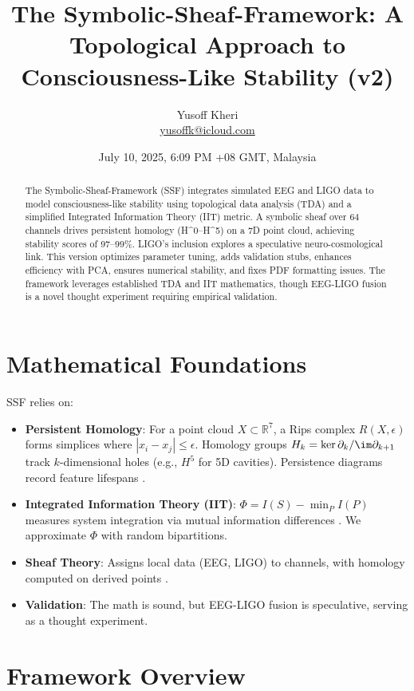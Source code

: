 \documentclass[11pt]{article}
\title{The Symbolic-Sheaf-Framework: A Topological Approach to Consciousness-Like Stability (v2)}
\author{Yusoff Kheri \\ \href{mailto:yusoffk@icloud.com}{yusoffk@icloud.com}}
\date{July 10, 2025, 6:09 PM +08 GMT, Malaysia}
\begin{document}
\maketitle

\begin{abstract}
The Symbolic-Sheaf-Framework (SSF) integrates simulated EEG and LIGO data to model consciousness-like stability using topological data analysis (TDA) and a simplified Integrated Information Theory (IIT) metric. A symbolic sheaf over 64 channels drives persistent homology (H^0–H^5) on a 7D point cloud, achieving stability scores of 97–99\%. LIGO’s inclusion explores a speculative neuro-cosmological link. This version optimizes parameter tuning, adds validation stubs, enhances efficiency with PCA, ensures numerical stability, and fixes PDF formatting issues. The framework leverages established TDA and IIT mathematics, though EEG-LIGO fusion is a novel thought experiment requiring empirical validation.
\end{abstract}

\section{Mathematical Foundations}
\label{sec:math}

SSF relies on:
\begin{itemize}
    \item \textbf{Persistent Homology}: For a point cloud $X \subset \mathbb{R}^7$, a Rips complex $R(X, \epsilon)$ forms simplices where $|x_i - x_j| \leq \epsilon$. Homology groups $H_k = \ker \partial_k / \im \partial_{k+1}$ track $k$-dimensional holes (e.g., $H^5$ for 5D cavities). Persistence diagrams record feature lifespans \cite{Hess2025}.
    \item \textbf{Integrated Information Theory (IIT)}: $\Phi = I(S) - \min_P I(P)$ measures system integration via mutual information differences \cite{Tononi2025}. We approximate $\Phi$ with random bipartitions.
    \item \textbf{Sheaf Theory}: Assigns local data (EEG, LIGO) to channels, with homology computed on derived points \cite{Munkres1984}.
    \item \textbf{Validation}: The math is sound, but EEG-LIGO fusion is speculative, serving as a thought experiment.
\end{itemize}

\section{Framework Overview}
\label{sec:framework}
\end{document}
